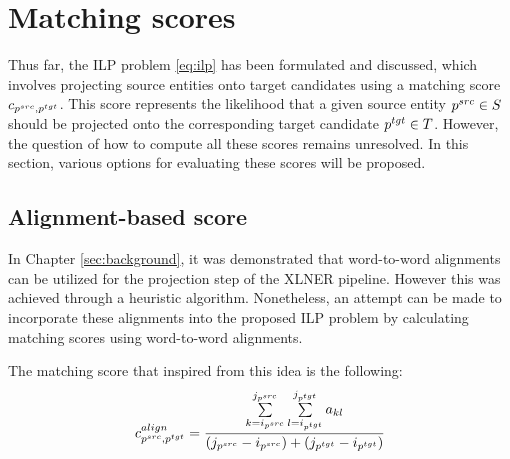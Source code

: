 \section{Matching scores}
Thus far, the ILP problem \eqref{eq:ilp} has been formulated and discussed,
which involves projecting source entities onto target candidates using a matching
score \( c_{p^{src}, p^{tgt}} \). This score represents the likelihood that a given
source entity \( p^{src} \in S \) should be projected onto the corresponding target
candidate \( p^{tgt} \in T \). However, the question of how to compute all these
scores remains unresolved. In this section, various options for evaluating these
scores will be proposed.

\subsection{Alignment-based score}
In Chapter \ref{sec:background}, it was demonstrated that word-to-word alignments
can be utilized for the projection step of the XLNER pipeline. However this was
achieved through a heuristic algorithm. Nonetheless, an attempt can be made to
incorporate these alignments into the proposed ILP problem by calculating matching
scores using word-to-word alignments.

The matching score that inspired from this idea is the following:
\begin{equation} \label{eq:align_cost}
  c_{p^{src}, p^{tgt}}^{align} =
  \frac{\sum\limits_{k=i_{p^{src}}}^{j_{p^{src}}} \sum\limits_{l=i_{p^{tgt}}}^{j_{p^{tgt}}} a_{kl}}
  {(j_{p^{src}} - i_{p^{src}}) + (j_{p^{tgt}} - i_{p^{tgt}})}
\end{equation}

